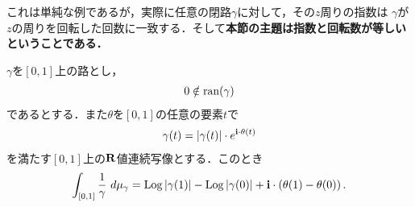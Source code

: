 	これは単純な例であるが，実際に任意の閉路$\gamma$に対して，その$z$周りの指数は
	$\gamma$が$z$の周りを回転した回数に一致する．そして{\bf 本節の主題は指数と回転数が等しいということである．}
	
	\begin{screen}
		\begin{thm}[分数関数に対する微分積分学の基本定理]
		\label{thm:fundamental_theorem_of_calculus_for_fractional_function_complex_line_integral}
			$\gamma$を$[0,1]$上の路とし，
			\begin{align}
				0 \notin \operatorname*{ran} (\gamma)
			\end{align}
			であるとする．また$\theta$を$[0,1]$の任意の要素$t$で
			\begin{align}
				\gamma(t) = |\gamma(t)| \cdot e^{\mathbf{i} \cdot \theta(t)}
			\end{align}
			を満たす$[0,1]$上の$\mathbf{R}$値連続写像とする．このとき
			\begin{align}
				\int_{[0,1]} \frac{1}{\gamma}\ d\mu_{\gamma}
				= \operatorname{Log}{|\gamma(1)|} - \operatorname{Log}{|\gamma(0)|}
				+ \mathbf{i} \cdot \left(\theta(1) - \theta(0)\right).
			\end{align}
		\end{thm}
	\end{screen}
	
